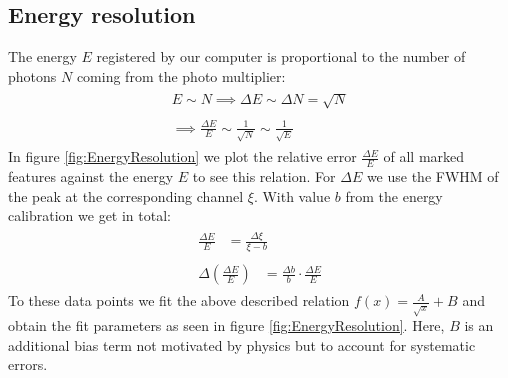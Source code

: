 \subsection*{Energy resolution}
%
The energy $E$ registered by our computer is proportional to the number of photons $N$ coming from the photo multiplier:
\begin{align}
    \label{eq:}
    \begin{split}
        E \sim N \implies \Delta E \sim \Delta N = \sqrt{N}
    \end{split}
    \\
    \label{eq:}
    \begin{split}
        \implies \frac{\Delta E}{E} \sim \frac{1}{\sqrt{N}} \sim \frac{1}{\sqrt{E}}
    \end{split}
\end{align}
%
In figure \ref{fig:EnergyResolution} we plot the relative error $\frac{\Delta E}{E}$ of all marked features against the energy $E$ to see this relation.
For $\Delta E$ we use the FWHM of the peak at the corresponding channel $\xi$.
With value $b$ from the energy calibration we get in total:
\begin{align}
    \label{eq:}
    \begin{split}
        \frac{\Delta E}{E} &= \frac{ \Delta \xi }{\xi - b}
    \end{split}
    \\
    \label{eq:}
    \begin{split}
        \Delta \left ( \frac{\Delta E}{E} \right ) &= \frac{ \Delta b }{ b } \cdot \frac{\Delta E}{E}
    \end{split}
\end{align}
%
To these data points we fit the above described relation $f(x) = \frac{A}{\sqrt{x}} + B$ and obtain the fit parameters as seen in figure \ref{fig:EnergyResolution}.
Here, $B$ is an additional bias term not motivated by physics but to account for systematic errors.
%
\par
%
\minipage{\linewidth}
